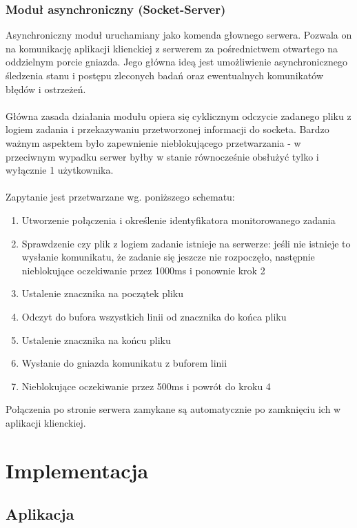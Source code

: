 \documentclass[a4paper,onecolumn,oneside,12pt]{memoir}
\begin{document}
{\subsection{Moduł asynchroniczny (Socket-Server)}
\quad \quad Asynchroniczny moduł uruchamiany jako komenda głownego serwera. Pozwala on na
komunikację aplikacji klienckiej z serwerem za pośrednictwem otwartego na oddzielnym
porcie gniazda. Jego główna ideą jest umożliwienie asynchronicznego śledzenia
stanu i postępu zleconych badań oraz ewentualnych komunikatów błędów i ostrzeżeń.\\
\\
Główna zasada działania modułu opiera się cyklicznym odczycie zadanego pliku z logiem
zadania i przekazywaniu przetworzonej informacji do socketa. Bardzo ważnym aspektem
było zapewnienie nieblokującego przetwarzania - w przeciwnym wypadku serwer byłby
w stanie równocześnie obsłużyć tylko i wyłącznie 1 użytkownika.\\
\\
Zapytanie jest przetwarzane wg. poniższego schematu:
\begin{enumerate}
\item Utworzenie połączenia i określenie identyfikatora monitorowanego zadania
\item Sprawdzenie czy plik z logiem zadanie istnieje na serwerze: jeśli nie istnieje
to wysłanie komunikatu, że zadanie się jeszcze nie rozpoczęło, następnie nieblokujące
oczekiwanie przez 1000ms i ponownie krok 2
\item Ustalenie znacznika na początek pliku
\item Odczyt do bufora wszystkich linii od znacznika do końca pliku
\item Ustalenie znacznika na końcu pliku
\item Wysłanie do gniazda komunikatu z buforem linii
\item Nieblokujące oczekiwanie przez 500ms i powrót do kroku 4
\end{enumerate}

Połączenia po stronie serwera zamykane są automatycznie po zamknięciu ich w aplikacji
klienckiej.\\

\chapter{Implementacja}
\section{Aplikacja}
}
\end{document}
